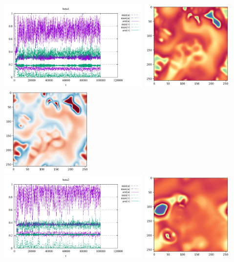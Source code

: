\begin{center}
\includegraphics[height=4.5cm]{python_codes/fieldstone_171/results/beta1_stats}
\includegraphics[height=4.5cm]{python_codes/fieldstone_171/results/beta1_solution_final_u.png}
\includegraphics[height=4.5cm]{python_codes/fieldstone_171/results/beta1_solution_final_v.png}\\
\includegraphics[height=4.5cm]{python_codes/fieldstone_171/results/beta2_stats}
\includegraphics[height=4.5cm]{python_codes/fieldstone_171/results/beta2_solution_final_u.png}

\end{center}
